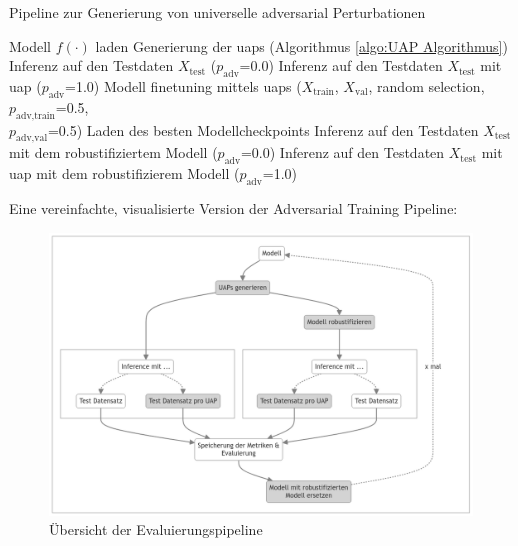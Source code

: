 \begin{algorithm}
\caption{Pipeline zur Generierung von universelle adversarial Perturbationen}
\label{alg:UAP_Adversarial_Training_Pipeline}
\begin{algorithmic}[1]
\STATE Modell $f(\cdot)$ laden
    \STATE Generierung der \acrshort{uap}s (Algorithmus \ref{algo:UAP Algorithmus})
    \STATE Inferenz auf den Testdaten $X_{\text{test}}$ ($p_{\text{adv}}$=0.0)
        \STATE Inferenz auf den Testdaten $X_{\text{test}}$ mit \acrshort{uap} ($p_{\text{adv}}$=1.0)
    \ENDFOR
    \STATE Modell finetuning mittels \acrshort{uap}s ($X_{\text{train}}$, $X_{\text{val}}$, random selection, $p_{\text{adv},\text{train}}$=0.5, \\
    $p_{\text{adv},\text{val}}$=0.5)
    \STATE Laden des besten Modellcheckpoints
    \STATE Inferenz auf den Testdaten $X_{\text{test}}$ mit dem robustifiziertem Modell ($p_{\text{adv}}$=0.0)
        \STATE Inferenz auf den Testdaten $X_{\text{test}}$ mit \acrshort{uap} mit dem robustifizierem Modell ($p_{\text{adv}}$=1.0)
    \ENDFOR
\ENDFOR
\end{algorithmic}
\end{algorithm}

Eine vereinfachte, visualisierte Version der Adversarial Training Pipeline:

\begin{figure}[H]
    \centering
    \includegraphics[width=\linewidth]{01-images/04-methodik/robustifizierungs-pipeline.png}
    \caption{Übersicht der Evaluierungspipeline}
    \label{fig:Evaluierungspipeline}
\end{figure}

